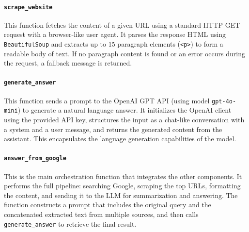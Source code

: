 \paragraph{\texttt{scrape\_website}}
This function fetches the content of a given URL using a standard HTTP GET request with a browser-like user agent. It parses the response HTML using \texttt{BeautifulSoup} and extracts up to 15 paragraph elements (\texttt{<p>}) to form a readable body of text. If no paragraph content is found or an error occurs during the request, a fallback message is returned.

\paragraph{\texttt{generate\_answer}}
This function sends a prompt to the OpenAI GPT API (using model \texttt{gpt-4o-mini}) to generate a natural language answer. It initializes the OpenAI client using the provided API key, structures the input as a chat-like conversation with a system and a user message, and returns the generated content from the assistant. This encapsulates the language generation capabilities of the model.

\paragraph{\texttt{answer\_from\_google}}
This is the main orchestration function that integrates the other components. It performs the full pipeline: searching Google, scraping the top URLs, formatting the content, and sending it to the LLM for summarization and answering. The function constructs a prompt that includes the original query and the concatenated extracted text from multiple sources, and then calls \texttt{generate\_answer} to retrieve the final result.

